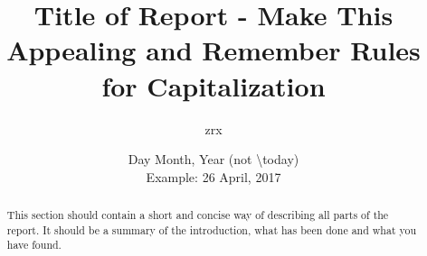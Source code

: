 \documentclass[11pt]{article}
\title{
    Title of Report - Make This Appealing and Remember Rules for Capitalization
    }
\author{
	zrx
}
\date{
    Day Month, Year (not \textbackslash today)\\
    Example: 26 April, 2017
}
\begin{document}
\maketitle
\begin{abstract}
    This section should contain a short and concise way of describing all parts of the report. It should be a summary of the introduction, what has been done and what you have found.
\end{abstract}
\newpage
\tableofcontents
\newpage
{} %






\newpage


\appendix
{}
\end{document}
